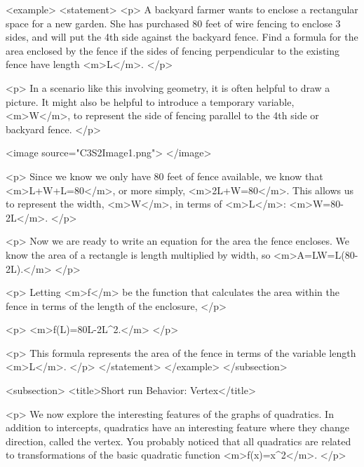         <example>
            <statement>
                <p>
                    A backyard farmer wants to enclose a rectangular space for a new garden.
                    She has purchased 80 feet of wire fencing to enclose 3 sides, and will put the 4th side against the backyard fence.
                    Find a formula for the area enclosed by the fence if the sides of fencing perpendicular to the existing fence have length <m>L</m>.
                </p>

                <p>
                    In a scenario like this involving geometry, it is often helpful to draw a picture.
                    It might also be helpful to introduce a temporary variable, <m>W</m>, to represent the side of fencing parallel to the 4th side or backyard fence.
                </p>

                <image source="C3S2Image1.png">
                </image>

                <p>
                    Since we know we only have 80 feet of fence available, we know that <m>L+W+L=80</m>, or more simply, <m>2L+W=80</m>.
                    This allows us to represent the width, <m>W</m>, in terms of <m>L</m>: <m>W=80-2L</m>.
                </p>

                <p>
                    Now we are ready to write an equation for the area the fence encloses.
                    We know the area of a rectangle is length multiplied by width, so <m>A=LW=L(80-2L).</m>
                </p>

                <p>
                    Letting <m>f</m> be the function that calculates the area within the fence in terms of the length of the enclosure,
                </p>

                <p>
                    <m>f(L)=80L-2L^{2}.</m>
                </p>

                <p>
                    This formula represents the area of the fence in terms of the variable length <m>L</m>.
                </p>
            </statement>
        </example>
    </subsection>


    <subsection>
        <title>Short run Behavior: Vertex</title>

        <p>
            We now explore the interesting features of the graphs of quadratics.
            In addition to intercepts, quadratics have an interesting feature where they change direction, called the vertex.
            You probably noticed that all quadratics are related to transformations of the basic quadratic function <m>f(x)=x^{2}</m>.
        </p>

